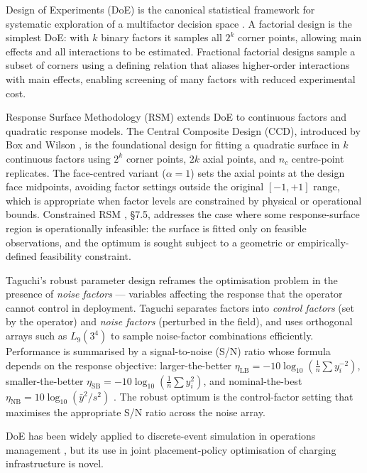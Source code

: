 \documentclass[conference]{IEEEtran}
\begin{document}
Design of Experiments (DoE) is the canonical statistical framework for systematic exploration of a multifactor decision space \cite{montgomery2017,box2005}. A factorial design is the simplest DoE: with $k$ binary factors it samples all $2^k$ corner points, allowing main effects and all interactions to be estimated. Fractional factorial designs \cite{montgomery2017} sample a subset of corners using a defining relation that aliases higher-order interactions with main effects, enabling screening of many factors with reduced experimental cost.

Response Surface Methodology (RSM) \cite{box1951,myers2016,khuri1996} extends DoE to continuous factors and quadratic response models. The Central Composite Design (CCD), introduced by Box and Wilson \cite{box1951}, is the foundational design for fitting a quadratic surface in $k$ continuous factors using $2^k$ corner points, $2k$ axial points, and $n_c$ centre-point replicates. The face-centred variant ($\alpha = 1$) sets the axial points at the design face midpoints, avoiding factor settings outside the original $[-1, +1]$ range, which is appropriate when factor levels are constrained by physical or operational bounds. Constrained RSM \cite{myers2016}, \S 7.5, addresses the case where some response-surface region is operationally infeasible: the surface is fitted only on feasible observations, and the optimum is sought subject to a geometric or empirically-defined feasibility constraint.

Taguchi's robust parameter design \cite{taguchi1986,phadke1989,ross1996} reframes the optimisation problem in the presence of \emph{noise factors} --- variables affecting the response that the operator cannot control in deployment. Taguchi separates factors into \emph{control factors} (set by the operator) and \emph{noise factors} (perturbed in the field), and uses orthogonal arrays such as $L_9(3^4)$ to sample noise-factor combinations efficiently. Performance is summarised by a signal-to-noise (S/N) ratio whose formula depends on the response objective: larger-the-better $\eta_\text{LB} = -10\log_{10}(\frac{1}{n}\sum y_i^{-2})$, smaller-the-better $\eta_\text{SB} = -10\log_{10}(\frac{1}{n}\sum y_i^2)$, and nominal-the-best $\eta_\text{NB} = 10\log_{10}(\bar{y}^2/s^2)$ \cite{taguchi1986,phadke1989}. The robust optimum is the control-factor setting that maximises the appropriate S/N ratio across the noise array.

DoE has been widely applied to discrete-event simulation in operations management \cite{kuhnle2019}, but its use in joint placement-policy optimisation of charging infrastructure is novel.
\end{document}
